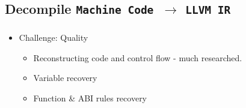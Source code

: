 \documentclass[mathserif,10pt]{beamer}
\newcommand{\cmt}[1]{}
\newcommand{\LIR}{{\tt LLVM IR}}
\newcommand{\MC}{{\tt Machine Code}}
\begin{document}
  \subsection{Decompile \MC \ $\rightarrow$ \LIR}
  \frame
  {
    \frametitle{\subsecname}
    \begin{itemize}
      \item Challenge: Quality     
      \begin{itemize}
        \item Reconstructing code and control flow - much researched.
        \item Variable recovery
        \item Function \& ABI rules recovery
      \end{itemize}
    \end{itemize}

    \cmt{
        These methods make various trade-offs between ease of adoption, binary size,
        ease of shipping, and quality of the resulting LLVMIR, which directly
          affects the benefits that allvm provides.

          \item Diffrentiate data \& code.
          \item Indirect branch/call.
          \item Variable instruction size
          \item Position independent code (PIC) sequences
          \item Hand crafted assembly code

    This point is very well researched and exists varisus tools QEMU[8], BAP [7], Dagger [6], and Fracture [23].
    }


  }
\end{document}
